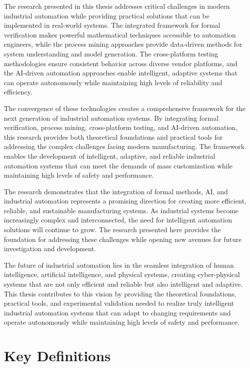 The research presented in this thesis addresses critical challenges in modern industrial automation while providing practical solutions that can be implemented in real-world systems. The integrated framework for formal verification makes powerful mathematical techniques accessible to automation engineers, while the process mining approaches provide data-driven methods for system understanding and model generation. The cross-platform testing methodologies ensure consistent behavior across diverse vendor platforms, and the AI-driven automation approaches enable intelligent, adaptive systems that can operate autonomously while maintaining high levels of reliability and efficiency.

The convergence of these technologies creates a comprehensive framework for the next generation of industrial automation systems. By integrating formal verification, process mining, cross-platform testing, and AI-driven automation, this research provides both theoretical foundations and practical tools for addressing the complex challenges facing modern manufacturing. The framework enables the development of intelligent, adaptive, and reliable industrial automation systems that can meet the demands of mass customization while maintaining high levels of safety and performance.

The research demonstrates that the integration of formal methods, AI, and industrial automation represents a promising direction for creating more efficient, reliable, and sustainable manufacturing systems. As industrial systems become increasingly complex and interconnected, the need for intelligent automation solutions will continue to grow. The research presented here provides the foundation for addressing these challenges while opening new avenues for future investigation and development.

The future of industrial automation lies in the seamless integration of human intelligence, artificial intelligence, and physical systems, creating cyber-physical systems that are not only efficient and reliable but also intelligent and adaptive. This thesis contributes to this vision by providing the theoretical foundations, practical tools, and experimental validation needed to realize truly intelligent industrial automation systems that can adapt to changing requirements and operate autonomously while maintaining high levels of safety and performance.

\section{Key Definitions}

